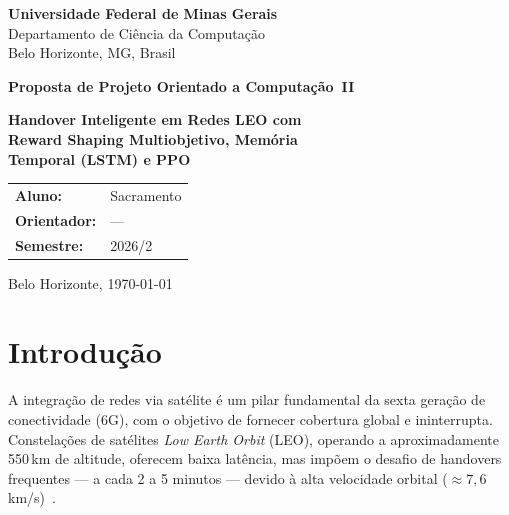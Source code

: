 \documentclass[12pt,a4paper]{article}
\begin{document}
\begin{titlepage}
  \centering
  \vspace*{1cm}
  {\large\textbf{Universidade Federal de Minas Gerais}}\\[0.3cm]
  {\large Departamento de Ciência da Computação}\\[0.2cm]
  {\normalsize Belo Horizonte, MG, Brasil}
  \vspace{3cm}

  {\LARGE\bfseries Proposta de Projeto Orientado a Computação~II}

  \vspace{1.5cm}

  {\large\bfseries
    Handover Inteligente em Redes LEO com\\
    Reward Shaping Multiobjetivo, Memória\\
    Temporal (LSTM) e PPO
  }

  \vspace{2cm}

  \begin{tabular}{ll}
    \textbf{Aluno:}      & Sacramento \\[4pt]
    \textbf{Orientador:} & --- \\[4pt]
    \textbf{Semestre:}   & 2026/2 \\
  \end{tabular}

  \vfill
  {\normalsize Belo Horizonte, \today}
\end{titlepage}

\tableofcontents
\newpage

\section{Introdução}

A integração de redes via satélite é um pilar fundamental da sexta geração de
conectividade (6G), com o objetivo de fornecer cobertura global e ininterrupta.
Constelações de satélites \textit{Low Earth Orbit} (LEO), operando a
aproximadamente 550\,km de altitude, oferecem baixa latência, mas impõem o
desafio de handovers frequentes --- a cada 2 a 5 minutos --- devido à alta
velocidade orbital ($\approx 7{,}6$\,km/s)~\cite{mohan2024}.
\end{document}
